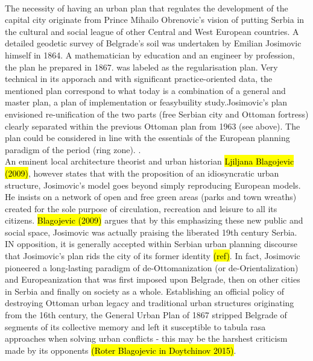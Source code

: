 \documentclass[11pt]{report}
\begin{document}
\\
The necessity of having an urban plan that regulates the development of the capital city originate from Prince Mihailo Obrenovic's vision of putting Serbia in the cultural and social league of other Central and West European countries. A detailed geodetic survey of Belgrade's soil was undertaken by Emilian Josimovic himself in 1864. A mathematician by education and an engineer by profession, the plan he prepared in 1867. was labeled as the regularisation plan. Very technical in its apporach and with significant practice-oriented data, the mentioned plan correspond to what today is a combination of a general and master plan, a plan of implementation or feasybuility study.\footnotemark Josimovic's plan envisioned re-unification of the two parts (free Serbian city and Ottoman fortress) clearly separated within the previous Ottoman plan from 1963 (see above). The plan could be considered in line with the essentials of the European planning paradigm of the period (ring zone). 
.
\\
An eminent local architecture theorist and urban historian \hl{Ljiljana Blagojevic (2009)}, however states that with the proposition of an idiosyncratic urban structure, Josimovic's model goes beyond simply reproducing European models. He insists on a network of open and free green areas (parks and town wreaths) created for the sole purpose of circulation, recreation and leisure to all its citizens. \hl{Blagojevic (2009)} argues that by this emphasizing these new public and social space, Josimovic was actually praising the liberated 19th century Serbia.
IN opposition, it is generally accepted within Serbian urban planning discourse that Josimovic's plan rids the city of its former identity \hl{(ref)}.
In fact, Josimovic pioneered a long-lasting paradigm of de-Ottomanization (or de-Orientalization) and Europeanization that was first imposed upon Belgrade, then on other cities in Serbia and finally on society as a whole. Establishing an official policy of destroying Ottoman urban legacy and traditional urban structures originating from the 16th century, the General Urban Plan of 1867 stripped Belgrade of segments of its collective memory and left it susceptible to tabula rasa approaches when solving urban conflicts - this may be the harshest criticism made by its opponents \hl{(Roter Blagojevic in Doytchinov 2015)}.
\end{document}
